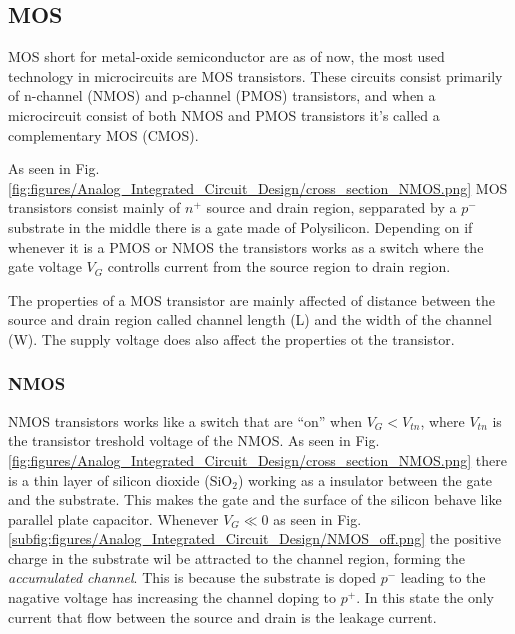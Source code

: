 \subsection{MOS}
MOS short for metal-oxide semiconductor are as of now, the most used technology in microcircuits are MOS transistors. These circuits consist primarily of n-channel (NMOS) and p-channel (PMOS) transistors, and when a microcircuit consist of both NMOS and PMOS transistors it's called a complementary MOS (CMOS).\cite[p. 14]{carusone_2012_analog}



As seen in Fig. \ref{fig:figures/Analog_Integrated_Circuit_Design/cross_section_NMOS.png} MOS transistors consist mainly of $n^+$ source and drain region, sepparated by a $p^-$ substrate in the middle there is a gate made of Polysilicon. Depending on if whenever it is a PMOS or NMOS the transistors works as a switch where the gate voltage $V_G$ controlls current from the source region to drain region. 

The properties of a MOS transistor are mainly affected of distance between the source and drain region called channel length (L) and the width of the channel (W). The supply voltage does also affect the properties ot the transistor. 



\subsubsection{NMOS}
NMOS transistors works like a switch that are ``on'' when $V_G < V_{tn}$, where $V_{tn}$ is the transistor treshold voltage of the NMOS. As seen in Fig. \ref{fig:figures/Analog_Integrated_Circuit_Design/cross_section_NMOS.png} there is a thin layer of silicon dioxide ($\text{SiO}_2$) working as a insulator between the gate and the substrate. This makes the gate and the surface of the silicon behave like parallel plate capacitor. Whenever $V_G\ll0$ as seen in Fig. \ref{subfig:figures/Analog_Integrated_Circuit_Design/NMOS_off.png} the positive charge in the substrate wil be attracted to the channel region, forming the \textit{accumulated channel}. This is because the substrate is doped $p^-$ leading to the nagative voltage has increasing the channel doping to $p^+$. In this state the only current that flow between the source and drain is the leakage current.

